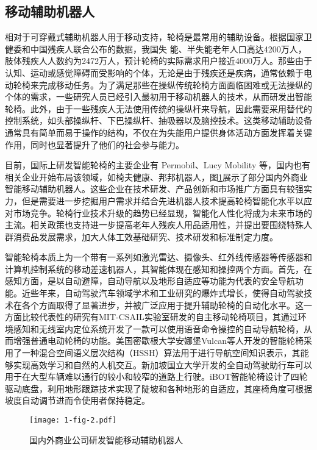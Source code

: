 \subsection{移动辅助机器人}
相对于可穿戴式辅助机器人用于移动支持，轮椅是最常用的辅助设备\cite{worldhealthorganizationGuidelinesProvisionManual2008}。根据国家卫健委和中国残疾人联合公布的数据，我国失
能、半失能老年人口高达4200万人，肢体残疾人人数约为2472万人，预计轮椅的实际需求用户接近4000万人。那些由于认知、运动或感觉障碍而受影响的个体，无论是由于残疾还是疾病，通常依赖于电动轮椅来完成移动任务。为了满足那些在操纵传统轮椅方面面临困难或无法操纵的个体的需求，一些研究人员已经引入最初用于移动机器人的技术，从而研发出智能轮椅。此外，由于一些残疾人无法使用传统的操纵杆来导航，因此需要采用替代的控制系统，如头部操纵杆、下巴操纵杆、抽吸器以及脑控技术\cite{kimLiteratureReviewSmart2023,carringtonWearablesChairablesInclusive2014,rulikControlWheelchairMounted6DOF2022}。这类移动辅助设备通常具有简单而易于操作的结构，不仅在为失能用户提供身体活动方面发挥着关键作用，同时也显著提升了他们的社会参与能力。

目前，国际上研发智能轮椅的主要企业有 Permobil、Lucy Mobility 等，国内也有相关企业开始布局该领域，如椅夫健康、邦邦机器人，图\ref{fig:1-2}展示了部分国内外商业智能移动辅助机器人。这些企业在技术研发、产品创新和市场推广方面具有较强实力，但是需要进一步挖掘用户需求并结合先进机器人技术提高轮椅智能化水平以应对市场竞争。轮椅行业技术升级的趋势已经显现，智能化人性化将成为未来市场的主流。相关政策也支持进一步提高老年人残疾人用品适用性，并提出要围绕特殊人群消费品发展需求，加大人体工效基础研究、技术研发和标准制定力度。

智能轮椅本质上为一个带有一系列如激光雷达、摄像头、红外线传感器等传感器和计算机控制系统的移动差速机器人\cite{ngIndirectControlAutonomous2020,leamanComprehensiveReviewSmart2017}，其智能体现在感知和操控两个方面\cite{kimLiteratureReviewSmart2023}。首先，在感知方面，是以自动避障，自动导航以及地形自适应等功能为代表的安全导航功能。近些年来，自动驾驶汽车领域学术和工业研究的爆炸式增长，使得自动驾驶技术在各个方面取得了显著进步，并被广泛应用于提升辅助轮椅的自动化水平。这一方面比较代表性的研究有MIT-CSAIL实验室研发的自主移动轮椅项目\cite{walterFrameworkLearningSemantic2014}，其通过环境感知和无线室内定位系统开发了一款可以使用语音命令操控的自动导航轮椅，从而增强普通电动轮椅的功能。美国密歇根大学安娜堡Vulcan等人\cite{fosterReflectanceFieldMap2023,parkDiscretetimeDynamicModeling2017}开发的智能轮椅采用了一种混合空间语义层次结构（HSSH）算法用于进行导航空间知识表示，其能够实现高效学习和自然的人机交互。新加坡国立大学开发的全自动驾驶助行车\cite{SelfdrivingScooterUnveiled}可以用于在大型车辆难以通行的较小和较窄的道路上行驶。iBOT智能轮椅设计了四轮驱动底盘\cite{MobiusMobilityNext}，利用地形跟踪技术实现了陡坡和各种地形的自适应，其座椅角度可根据坡度自动调节进而令使用者保持稳定。
\begin{figure}[h]
  \centering
  \texttt{[image: 1-fig-2.pdf]}
  \caption{国内外商业公司研发智能移动辅助机器人}
  \label{fig:1-2}
\end{figure}

